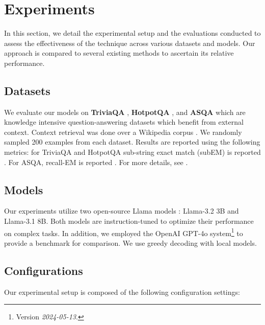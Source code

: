 

\section{Experiments}
\label{sec:experiments}

In this section, we detail the experimental setup and the evaluations conducted to assess the effectiveness of the \rephrase{} technique across various datasets and models. Our approach is compared to several existing methods to ascertain its relative performance.


\subsection{Datasets}

We evaluate our models on \mbox{\textbf{TriviaQA}} \cite{joshi-etal-2017-triviaqa}, \textbf{HotpotQA} \cite{yang-etal-2018-hotpotqa}, and \textbf{ASQA} \cite{stelmakh-etal-2022-asqa} which are knowledge intensive question-answering datasets which benefit from external context. Context retrieval was done over a Wikipedia corpus \cite{zhangRetrieveAnythingAugment2023}. We randomly sampled 200 examples from each dataset.  Results are reported using the following metrics: for TriviaQA and HotpotQA sub-string exact match (subEM) is reported \cite{asaiSelfRAGLearningRetrieve2023,yenHELMETHowEvaluate2024}. For ASQA, recall-EM is reported \cite{gaoEnablingLargeLanguage2023a}. For more details, see .

\subsection{Models}
\label{sec:models}

Our experiments utilize two open-source Llama models \cite{grattafioriLlama3Herd2024}: Llama-3.2 3B and Llama-3.1 8B. Both models are instruction-tuned to optimize their performance on complex tasks. In addition, we employed the OpenAI GPT-4o system\footnote{Version \textit{2024-05-13}.} \cite{openaiGPT4oSystemCard2024} to provide a benchmark for comparison. We use greedy decoding with local models.

\subsection{Configurations}
\label{sec:configs}

Our experimental setup is composed of the following configuration settings:

